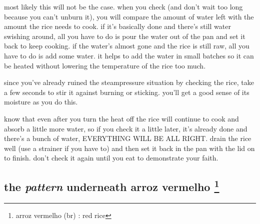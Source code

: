 most likely this will not be the case. when you check (and don't
wait too long because you can't unburn it), you will compare the
amount of water left with the amount the rice needs to cook. if
it's basically done and there's still water swishing around, all
you have to do is pour the water out of the pan and set it back to
keep cooking. if the water's almost gone and the rice is still raw,
all you have to do is add some water. it helps to add the water in
small batches so it can be heated without lowering the temperature of
the rice too much.

since you've already ruined the steampressure situation by checking
the rice, take a few seconds to stir it against burning or
sticking. you'll get a good sense of its moisture as you do this.

know that even after you turn the heat off the rice will continue to
cook and absorb a little more water, so if you check it a little
later, it's already done and there's a bunch of water, EVERYTHING WILL
BE ALL RIGHT. drain the rice well (use a strainer if you have to) and
then set it back in the pan with the lid on to finish. don't check it
again until you eat to demonstrate your faith.

\subsection{the \textit{pattern} underneath arroz vermelho
\footnote{arroz vermelho (br) : red rice}}

